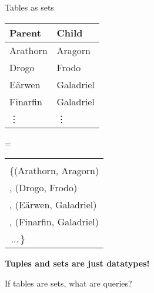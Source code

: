 \documentclass[xcolor=table,usenames,dvipsnames,svgnames]{beamer}
\begin{document}

\begin{frame}{Tables as sets}\large
  \begin{minipage}{0.4\textwidth}
    \centering
    \begin{tabular}{l|l}
      \textbf{Parent} & \textbf{Child}\\\hline
      Arathorn & Aragorn\\
      Drogo & Frodo\\
      E\"arwen & Galadriel\\
      Finarfin & Galadriel\\
      \hfill\vdots & \hfill\vdots
    \end{tabular}


  \end{minipage}
  \hfill{\LARGE =}\hfill
  \begin{minipage}{0.51\textwidth}
    \centering

    \begin{tabular}{l}
      \color{gray}{// set of (parent, child) pairs}\\
      \{\hspace{1pt}(Arathorn, Aragorn)\\
      , (Drogo, Frodo)\\
      , (E\"arwen, Galadriel)\\
      , (Finarfin, Galadriel)\\
      \,...\,\} \phantom{\vdots}
    \end{tabular}

  \end{minipage}

\end{frame}


\begin{frame}\Large\centering
  \bf Tuples and sets are just datatypes!

  \vspace{2em}\pause

  If tables are sets, what are queries?
\end{frame}
\end{document}
